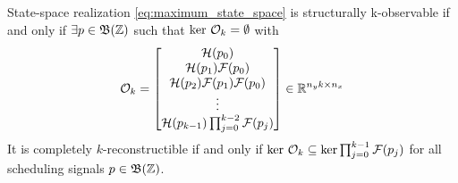 \begin{lemma}
\label{lem:observability_matrix}
    State-space realization \eqref{eq:maximum_state_space} is structurally k-observable if and only if $\exists p\in \mathfrak{B}(\mathbb{Z})$ such that $\text{ker}\ \mathcal{O}_k = \emptyset$ with
    \begin{equation}
        \mathcal{O}_{k} = 
        \begin{bmatrix}
            \mathcal{H}(p_{0}) \\
            \mathcal{H}(p_{1}) \mathcal{F}(p_{0}) \\
            \mathcal{H}(p_{2}) \mathcal{F}(p_{1}) \mathcal{F}(p_{0}) \\
            \vdots \\
            \mathcal{H}(p_{k-1}) \prod_{j=0}^{k-2} \mathcal{F}(p_{j})
        \end{bmatrix}
        \in \mathbb{R}^{n_y k \times n_x}
        \label{eq:obsv_matrix_generic}
    \end{equation}
    It is completely $k$-reconstructible if and only if $\text{ker}\ \mathcal{O}_k \subseteq \text{ker}\prod_{j=0}^{k-1} \mathcal{F}(p_{j})$ for all scheduling signals $p\in \mathfrak{B}(\mathbb{Z})$.
\end{lemma}
